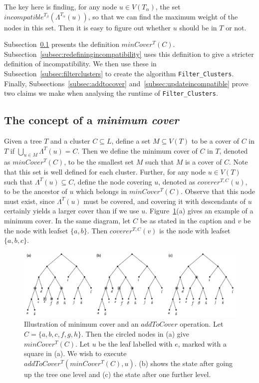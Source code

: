 \documentclass{article}
\newcommand{\leafset}{\Lambda}
\newcommand{\TA}{T_\alpha}
\newcommand{\TB}{T_\beta}
\begin{document}
    The key here is finding, for any node $u \in V(\TA)$, the set $incompatible^{\TB}(\leafset^{\TA}(u))$, so that we can find the maximum weight of the nodes in this set. Then it is easy to figure out whether $u$ should be in $T$ or not.

    Subsection~\ref{subsec:mincover} presents the definition $minCover^{T}(C)$. Subsection~\ref{subsec:redefiningincompatibility} uses this definition to give a stricter definition of incompatibility. We then use these in Subsection~\ref{subsec:filterclusters} to create the algorithm \texttt{Filter\_Clusters}. Finally, Subsections~\ref{subsec:addtocover} and~\ref{subsec:updateincompatible} prove two claims we make when analysing the runtime of \texttt{Filter\_Clusters}.

    \subsection{The concept of a \textit{minimum cover}}
    \label{subsec:mincover}

    Given a tree $T$ and a cluster $C \subseteq L$, define a set $M \subseteq V(T)$ to be a cover of $C$ in $T$ if $\bigcup_{u \in M} \leafset^{T}(u) = C$. Then we define the minimum cover of $C$ in $T$, denoted as $minCover^{T}(C)$, to be the smallest set $M$ such that $M$ is a cover of $C$. Note that this set is well defined for each cluster. Further, for any node $u \in V(T)$ such that $\leafset^{T}(u) \subseteq C$, define the node covering $u$, denoted as $coverer^{T, C}(u)$, to be the ancestor of $u$ which belongs in $minCover^{T}(C)$. Observe that this node must exist, since $\leafset^{T}(u)$ must be covered, and covering it with descendants of $u$ certainly yields a larger cover than if we use $u$. Figure~\ref{fig:mincoverrecursive}(a) gives an example of a minimum cover. In the same diagram, let $C$ be as stated in the caption and $v$ be the node with leafset $\{a, b\}$. Then $coverer^{T, C}(v)$ is the node with leafset $\{a, b, c\}$.

    \begin{figure}[ht]
        \includegraphics[scale=0.48]{mincoverrecursive}
        \centering
        \caption[Minimum cover and the $addToCover$ operation]{Illustration of minimum cover and an $addToCover$ operation. Let $C = \{a, b, c, f, g, h\}$. Then the circled nodes in (a) give $minCover^{T}(C)$. Let $u$ be the leaf labelled with $e$, marked with a square in (a). We wish to execute $addToCover^{T}(minCover^{T}(C), u)$. (b) shows the state after going up the tree one level and (c) the state after one further level.}
        \label{fig:mincoverrecursive}
    \end{figure}
\end{document}
